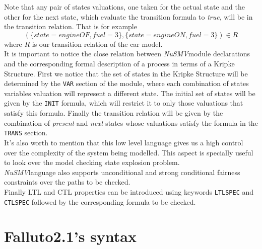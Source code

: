 \documentclass[12pt]{article}
\newcommand{\nusmv}{\mbox{\textit{NuSMV}}}
\begin{document}
Note that any pair of states valuations, one taken for the actual state and the
other for the next state, which evaluate the transition formula to \textit{true},
will be in the transition relation. That is for example
$$(\{state=engineOF, fuel=3\},\{state=engineON,fuel=3\}) \in R$$ where $R$ is our
transition relation of the car model.\\
It is important to notice the close relation between \nusmv module declarations and the corresponding formal description of a process in terms of a Kripke Structure. First we notice that the set of states in the Kripke Structure will be determined by the \texttt{VAR} section of the module, where each combination of states variables valuation will represent a different state. The initial set of states will be given by the \texttt{INIT} formula, which will restrict it to only those valuations that satisfy this formula. Finally the transition relation will be given by the combination of \textit{present} and \textit{next} states whose valuations satisfy the formula in the \texttt{TRANS} section.\\
It's also worth to mention that this low level language gives us a high control over the complexity of the system being modelled. This aspect is specially useful to look over the model checking state explosion problem.\\
\nusmv language also supports unconditional and strong conditional fairness constraints over the paths to be checked.\\
Finally LTL and CTL properties can be introduced using keywords \texttt{LTLSPEC} and \texttt{CTLSPEC} followed by the corresponding formula to be checked.



\section{Falluto2.1's syntax}
\end{document}
